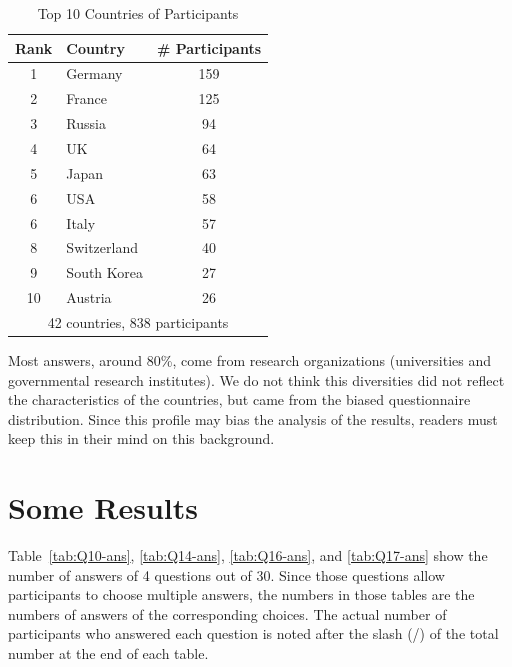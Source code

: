 \documentclass[sigconf,nonacm]{acmart}
\begin{document}
\begin{table}[htb]%
\begin{center}%
\caption{\small Top 10 Countries of Participants}
\vspace{-3mm}
\label{tab:countries}%
\begin{tabular}{c|l|c}%
\hline%
Rank & Country & \# Participants \\%
\hline%
1 & Germany 	& 159 \\%
2 & France 	& 125 \\%
3 & Russia 	& 94 \\%
4 & UK 		& 64 \\%
5 & Japan 	& 63 \\%
6 & USA 		& 58 \\%
6 & Italy 		& 57 \\%
\hline
8 & Switzerland & 40 \\%
9 & South Korea & 27 \\%
10 & Austria 	& 26  \\%
\hline%
\multicolumn{3}{c}{42 countries, 838 participants} \\%
\end{tabular}%
\end{center}%
\vspace{-5mm}
\end{table}%

Most answers, around 80\%, come from research organizations
(universities and governmental research institutes).  We do not think this
diversities did not reflect the characteristics of the countries, but
came from the biased questionnaire distribution.
Since this profile may bias the analysis of the results,
readers must keep this in their mind on this background.

\section{Some Results}

Table~\ref{tab:Q10-ans}, \ref{tab:Q14-ans}, \ref{tab:Q16-ans}, and
\ref{tab:Q17-ans} show the number of answers of 4 questions out of
30. Since those questions allow participants to choose multiple answers,
the numbers in those tables are the numbers of answers of the
corresponding choices. The actual number of participants who answered
each question is noted after the slash (/) of the total number
at the end of each table.
\end{document}
